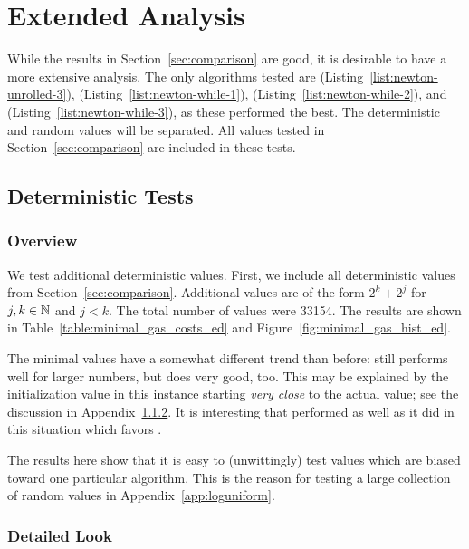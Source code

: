 \section{Extended Analysis}
\label{app:extended}

While the results in Section~\ref{sec:comparison} are good,
it is desirable to have a more extensive analysis.
The only algorithms tested are
\UnrolledThree{} (Listing~\ref{list:newton-unrolled-3}),
\WhileOne{} (Listing~\ref{list:newton-while-1}),
\WhileTwo{} (Listing~\ref{list:newton-while-2}), and
\WhileThree{} (Listing~\ref{list:newton-while-3}),
as these performed the best.
The deterministic and random values will be separated.
All values tested in Section~\ref{sec:comparison}
are included in these tests.

\subsection{Deterministic Tests}
\label{app:deterministic}

\subsubsection{Overview}

We test additional deterministic values.
First, we include all deterministic values from Section~\ref{sec:comparison}.
Additional values are of the form $2^{k} + 2^{j}$ for $j,k\in\mathbb{N}$ and $j < k$.
The total number of values were 33154.
The results are shown in Table~\ref{table:minimal_gas_costs_ed}
and Figure~\ref{fig:minimal_gas_hist_ed}.

The minimal values have a somewhat different trend than before:
\UnrolledThree{} still performs well for larger numbers,
but \WhileOne{} does very good, too.
This may be explained by the initialization value in this instance
starting \emph{very close} to the actual value;
see the discussion in Appendix~\ref{app:deterministic_detailed}.
It is interesting that \UnrolledThree{} performed as well as it did
in this situation which favors \WhileOne{}.

The results here show that it is easy to (unwittingly)
test values which are biased toward one particular algorithm.
This is the reason for testing a large collection
of random values in Appendix~\ref{app:loguniform}.

\subsubsection{Detailed Look}
\label{app:deterministic_detailed}

